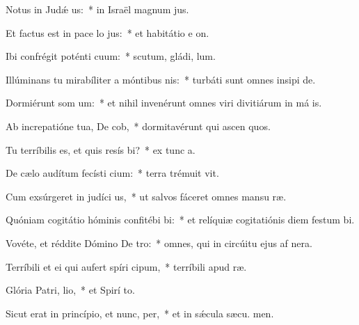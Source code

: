 \item Notus in Judǽ us:~* in Israël magnum  jus.
\item Et factus est in pace lo jus:~* et habitátio e  on.
\item Ibi confrégit poténti cuum:~* scutum, gládi,  lum.
\item Illúminans tu mirabíliter a móntibus nis:~* turbáti sunt omnes insipi de.
\item Dormiérunt som um:~* et nihil invenérunt omnes viri divitiárum in má is.
\item Ab increpatióne tua, De cob,~* dormitavérunt qui ascen quos.
\item Tu terríbilis es, et quis resís bi?~* ex tunc  a.
\item De cælo audítum fecísti cium:~* terra trémuit  vit.
\item Cum exsúrgeret in judíci us,~* ut salvos fáceret omnes mansu ræ.
\item Quóniam cogitátio hóminis confitébi bi:~* et relíquiæ cogitatiónis diem festum  bi.
\item Vovéte, et réddite Dómino De tro:~* omnes, qui in circúitu ejus af nera.
\item Terríbili et ei qui aufert spíri cipum,~* terríbili apud  ræ.
\item Glória Patri,  lio,~* et Spirí to.
\item Sicut erat in princípio, et nunc,  per,~* et in sǽcula sæcu. men.
